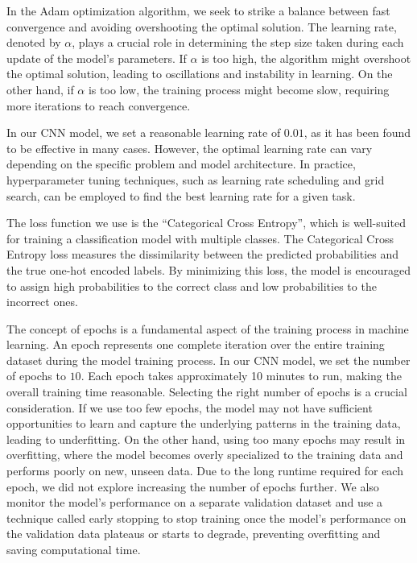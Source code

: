 \documentclass[11pt,a4paper]{article}
\begin{document}
\noindent
In the Adam optimization algorithm, we seek to strike a balance between fast convergence and avoiding overshooting the optimal solution. The learning rate, denoted by $\alpha$, plays a crucial role in determining the step size taken during each update of the model's parameters. If $\alpha$ is too high, the algorithm might overshoot the optimal solution, leading to oscillations and instability in learning. On the other hand, if $\alpha$ is too low, the training process might become slow, requiring more iterations to reach convergence.

In our CNN model, we set a reasonable learning rate of $0.01$, as it has been found to be effective in many cases. However, the optimal learning rate can vary depending on the specific problem and model architecture. In practice, hyperparameter tuning techniques, such as learning rate scheduling and grid search, can be employed to find the best learning rate for a given task.

The loss function we use is the ``Categorical Cross Entropy'', which is well-suited for training a classification model with multiple classes. The Categorical Cross Entropy loss measures the dissimilarity between the predicted probabilities and the true one-hot encoded labels. By minimizing this loss, the model is encouraged to assign high probabilities to the correct class and low probabilities to the incorrect ones.

The concept of epochs is a fundamental aspect of the training process in machine learning. An epoch represents one complete iteration over the entire training dataset during the model training process. In our CNN model, we set the number of epochs to $10$. Each epoch takes approximately 10 minutes to run, making the overall training time reasonable. Selecting the right number of epochs is a crucial consideration. If we use too few epochs, the model may not have sufficient opportunities to learn and capture the underlying patterns in the training data, leading to underfitting. On the other hand, using too many epochs may result in overfitting, where the model becomes overly specialized to the training data and performs poorly on new, unseen data. Due to the long runtime required for each epoch, we did not explore increasing the number of epochs further. We also monitor the model's performance on a separate validation dataset and use a technique called early stopping to stop training once the model's performance on the validation data plateaus or starts to degrade, preventing overfitting and saving computational time. 
\end{document}
